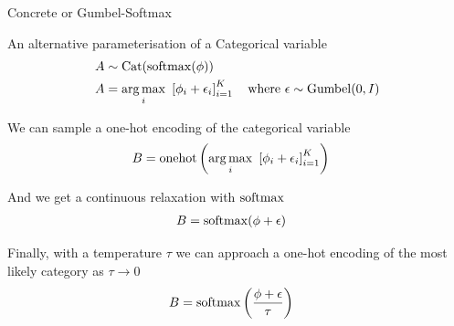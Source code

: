 \begin{frame}{Concrete or Gumbel-Softmax}

An alternative parameterisation of a Categorical variable
\begin{equation}
\begin{aligned}
A &\sim \operatorname{Cat}(\operatorname{softmax}(\phi)) \\
A &= \operatorname*{arg\,max}_i ~ \left[\phi_i + \epsilon_i\right]_{i=1}^{K} \quad \text{where } \epsilon \sim \operatorname*{Gumbel}(0, I)
\end{aligned}
\end{equation}

\pause

We can sample a one-hot encoding of the categorical variable
\begin{equation}
\begin{aligned}
B &= \onehot\left( \argmax_i ~ \left[\phi_i + \epsilon_i\right]_{i=1}^{K} \right) %
\end{aligned}
\end{equation}

\pause

And we get a continuous relaxation with $\operatorname{softmax}$
\begin{equation}
\begin{aligned}
B &= \operatorname{softmax} (\phi + \epsilon) 
\end{aligned}
\end{equation}

\pause

Finally, with a temperature $\tau$ we can approach a one-hot encoding of the most likely category as $\tau \to 0$
\begin{equation}
\begin{aligned}
B &= \operatorname{softmax} \left(\frac{\phi + \epsilon}{\tau} \right) 
\end{aligned}
\end{equation}

\end{frame}

